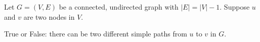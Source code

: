 \begin{prob}

    Let $G = (V, E)$ be a connected, undirected graph with $|E| = |V| - 1$.
    Suppose $u$ and $v$ are two nodes in $V$.

    True or False: there can be two different simple paths from $u$ to $v$ in $G$.

    \tF{}

\end{prob}
